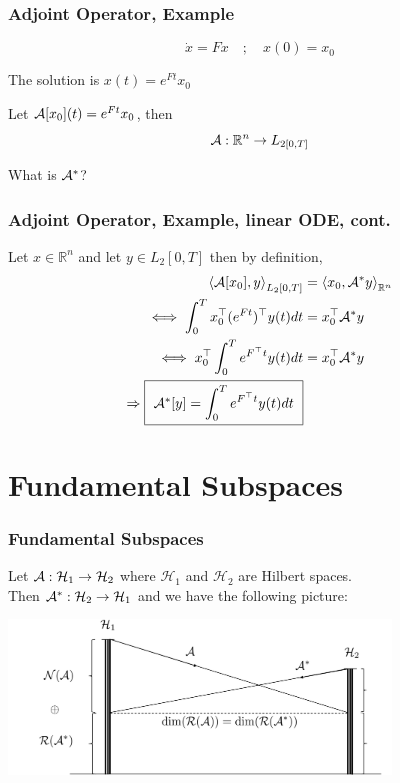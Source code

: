 \documentclass{beamer}
\begin{document}
\begin{frame}\frametitle{Adjoint Operator, Example}
	\begin{example}
		\[ \dot{x} = Fx \quad ; \quad x(0) = x_0 \]
		
		\vfill
		
		The solution is $x(t) = e^{Ft}x_0$
		
		\vfill
		
		Let $\mathcal{A}[x_0](t) = e^{Ft}x_0$, then
		\[ \mathcal{A}:\mathbb{R}^n \to L_{2[0,T]} \]
		
		\vfill 
		
		What is $\mathcal{A}^\ast$?
	\end{example}
\end{frame}

\begin{frame}\frametitle{Adjoint Operator, Example, linear ODE, cont.}
	Let $x \in \mathbb{R}^n$ and let $y \in L_2[0,T]$ then by definition,
		\begin{align*}
			\left<\mathcal{A}[x_0],y \right>_{L_2[0,T]} &= \left<x_0, \mathcal{A}^\ast y \right>_{\mathbb{R}^n} \\
			\iff \int_0^T x_0^\top(e^{Ft})^\top y(t)dt &= x_0^\top \mathcal{A}^\ast y \\
			\iff x_0^\top \int_0^T e^{F^\top t}y(t) dt &= x_0^\top \mathcal{A}^\ast y \\
			\Rightarrow \fbox{ $\mathcal{A}^\ast[y] = \displaystyle \int_0^Te^{F^\top t}y(t)dt $ }\\
		\end{align*}
\end{frame}


\section{Fundamental Subspaces}
\frame{\sectionpage}

\begin{frame}\frametitle{Fundamental Subspaces}
	Let $\mathcal{A}: \mathcal{H}_1 \to \mathcal{H}_2$ where $\mathcal{H}_1$ and $\mathcal{H}_2$ are Hilbert spaces. \\
	Then $\mathcal{A}^\ast:\mathcal{H}_2 \to \mathcal{H}_1$ and we have the following picture:\\
	\begin{center}
		\includegraphics[width=4in]{figures/chap4_fundamental_subspaces}\\
	\end{center}
\end{frame}
\end{document}
